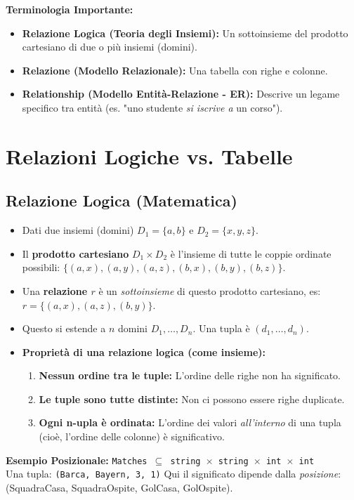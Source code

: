 \textbf{Terminologia Importante:}
\begin{itemize}
	\item \textbf{Relazione Logica (Teoria degli Insiemi):} Un sottoinsieme del prodotto cartesiano di due o più insiemi (domini).
	\item \textbf{Relazione (Modello Relazionale):} Una tabella con righe e colonne.
	\item \textbf{Relationship (Modello Entità-Relazione - ER):} Descrive un legame specifico tra entità (es. "uno studente \textit{si iscrive a} un corso").
\end{itemize}

\section{Relazioni Logiche vs. Tabelle}
\subsection{Relazione Logica (Matematica)}
\begin{itemize}
	\item Dati due insiemi (domini) $D_1 = \{a,b\}$ e $D_2 = \{x,y,z\}$.
	\item Il \textbf{prodotto cartesiano} $D_1 \times D_2$ è l'insieme di tutte le coppie ordinate possibili: $\{(a,x), (a,y), (a,z), (b,x), (b,y), (b,z)\}$.
	\item Una \textbf{relazione $r$} è un \textit{sottoinsieme} di questo prodotto cartesiano, es: $r = \{(a,x), (a,z), (b,y)\}$.
	\item Questo si estende a $n$ domini $D_1, \dots, D_n$. Una tupla è $(d_1, \dots, d_n)$.
	\item \textbf{Proprietà di una relazione logica (come insieme):}
	\begin{enumerate}
		\item \textbf{Nessun ordine tra le tuple:} L'ordine delle righe non ha significato.
		\item \textbf{Le tuple sono tutte distinte:} Non ci possono essere righe duplicate.
		\item \textbf{Ogni n-upla è ordinata:} L'ordine dei valori \textit{all'interno} di una tupla (cioè, l'ordine delle colonne) è significativo.
	\end{enumerate}
\end{itemize}
\textbf{Esempio Posizionale:}
\texttt{Matches $\subseteq$ string $\times$ string $\times$ int $\times$ int} \\
Una tupla: \texttt{(Barca, Bayern, 3, 1)}
Qui il significato dipende dalla \textit{posizione}: (SquadraCasa, SquadraOspite, GolCasa, GolOspite).

